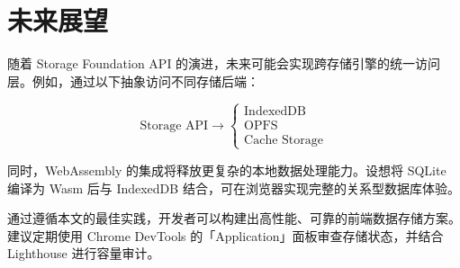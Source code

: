 \chapter{未来展望}
随着 Storage Foundation API 的演进，未来可能会实现跨存储引擎的统一访问层。例如，通过以下抽象访问不同存储后端：\par
$$ \text{Storage API} \rightarrow \begin{cases} \text{IndexedDB} \\ \text{OPFS} \\ \text{Cache Storage} \end{cases} $$\par
同时，WebAssembly 的集成将释放更复杂的本地数据处理能力。设想将 SQLite 编译为 Wasm 后与 IndexedDB 结合，可在浏览器实现完整的关系型数据库体验。\par
通过遵循本文的最佳实践，开发者可以构建出高性能、可靠的前端数据存储方案。建议定期使用 Chrome DevTools 的「Application」面板审查存储状态，并结合 Lighthouse 进行容量审计。\par
